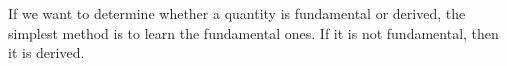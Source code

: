 \begin{itemize}
\end{itemize}

\begin{remark}
    If we want to determine whether a quantity is fundamental or derived, the simplest method is to learn the fundamental ones.
    If it is not fundamental, then it is derived.
\end{remark}

